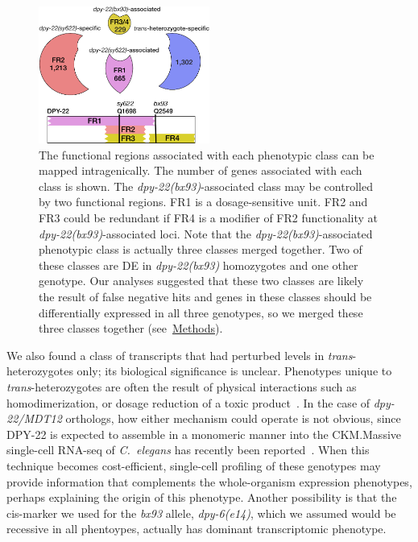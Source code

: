 \documentclass[9pt,twocolumn,twoside]{gsajnl}
\newcommand{\cel}{\emph{C.~elegans}}
\newcommand{\gene}[1]{\mbox{\emph{#1}}}
\newcommand{\protein}[1]{\mbox{\uppercase{#1}}}
\newcommand{\dpy}[1]{\gene{dpy-22#1}}
\newcommand{\bx}{\dpy{(bx93)}}
\begin{document}
\begin{figure}
  \centering{}
  \includegraphics[width=0.5\textwidth]{../figs/inferred_domains.pdf}
  \caption{
          The functional regions associated with each phenotypic class can be
          mapped intragenically. The number of genes associated with each class
          is shown. The \bx{}-associated class may be controlled by two
          functional regions. FR1 is a dosage-sensitive unit. FR2 and FR3 could
          be redundant if FR4 is a modifier of FR2 functionality at
          \bx{}-associated loci. Note that the \bx{}-associated phenotypic class
          is actually three classes merged together. Two of these classes are DE
          in \bx{} homozygotes and one other genotype. Our analyses suggested
          that these two classes are likely the result of false negative hits
          and genes in these classes should be differentially expressed in all
          three genotypes, so we merged these three classes together
          (see~\hyperref[sec:methods]{Methods}). }
\label{fig:domains}
\end{figure}

We also found a class of transcripts that had perturbed levels in
\emph{trans}-heterozygotes only; its biological significance is unclear.
Phenotypes unique to \emph{trans}-heterozygotes are often the result of physical
interactions such as homodimerization, or dosage reduction of a toxic
product~\citep{Yook2005}. In the case of \dpy{/MDT12} orthologs, how either
mechanism could operate is not obvious, since \protein{dpy-22} is expected to
assemble in a monomeric manner into the CKM.\@ Massive single-cell RNA-seq of
\cel{} has recently been reported~\citep{Cao2017}. When this technique becomes
cost-efficient, single-cell profiling of these genotypes may provide information
that complements the whole-organism expression phenotypes, perhaps explaining
the origin of this phenotype. Another possibility is that the cis-marker we used
for the \emph{bx93} allele, \gene{dpy-6(e14)}, which we assumed would be
recessive in all phentoypes, actually has dominant transcriptomic phenotype.
\end{document}
